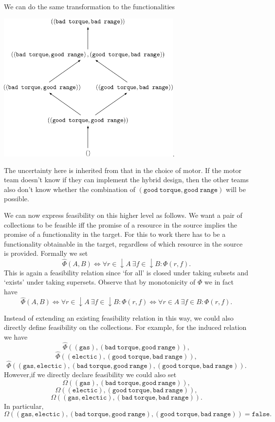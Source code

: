 \documentclass[12pt]{article}
\theoremstyle{definition}
\theoremstyle{plain}
\theoremstyle{plain}
\theoremstyle{plain}
\theoremstyle{plain}
\theoremstyle{remark}
\theoremstyle{remark}
\begin{document}
We can do the same transformation to the functionalities
\begin{center}
	\includegraphics[width=260pt]{section6/6.1/anti_outputs.png}.
\end{center}
The uncertainty here is inherited from that in the choice of motor. If the motor team doesn't know if they can implement the hybrid design, then the other teams also don't know whether the combination of $\mathtt{(good\ torque, good \ range)}$ will be possible.

We can now express feasibility on this higher level as follows. We want a pair of collections to be feasible iff the promise of a resource in the source implies the promise of a functionality in the target. For this to work there has to be a functionality obtainable in the target, regardless of which resource in the source is provided. Formally we set
$$\hat\Phi(A,B) \iff  \forall r \in \downarrow A \: \exists f \in \downarrow B : \Phi(r,f).$$
This is again a feasibility relation since `for all' is closed under taking subsets and `exists' under taking supersets. Observe that by monotonicity of $\Phi$ we in fact have 
$$\hat\Phi(A,B) \iff \forall r \in \downarrow A \: \exists f \in \downarrow B : \Phi(r,f) \iff \forall r \in A \: \exists f \in B : \Phi(r,f).$$

Instead of extending an existing feasibility relation in this way, we could also directly define feasibility on the collections. For example, for the induced relation we have 
$$\hat\Phi((\mathtt{gas}), \mathtt{(bad\ torque, good\ range)}),$$
$$\hat\Phi((\mathtt{electic}), \mathtt{(good\ torque, bad\ range)}),$$
$$\hat\Phi((\mathtt{gas},\mathtt{electic}), \mathtt{(bad\ torque, good\ range), (good\ torque, bad\ range)}).$$
However,if we directly declare feasibility we could also set 
$$\Omega((\mathtt{gas}), \mathtt{(bad\ torque, good\ range)}),$$
$$\Omega((\mathtt{electic}), \mathtt{(good\ torque, bad\ range)}),$$
$$\Omega((\mathtt{gas},\mathtt{electic}), \mathtt{(bad\ torque, bad\ range)}).$$
In particular, 
$$\Omega((\mathtt{gas},\mathtt{electic}), \mathtt{(bad\ torque, good\ range), (good\ torque, bad\ range)}) = \mathtt{false}.$$
\end{document}
